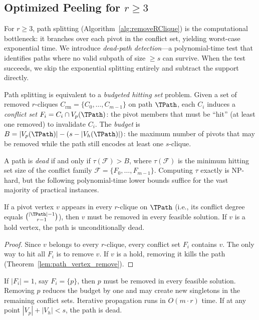 
\subsection{Optimized Peeling for $r \ge 3$}
\label{sec:opt_r3}

For $r \ge 3$, path splitting (Algorithm~\ref{alg:removeRClique}) is the computational bottleneck:
it branches over each pivot in the conflict set, yielding worst-case exponential time.
We introduce \emph{dead-path detection}---a polynomial-time test that identifies paths where no valid subpath of size $\ge s$ can survive.
When the test succeeds, we skip the exponential splitting entirely and subtract the support directly.

Path splitting is equivalent to a \emph{budgeted hitting set} problem.
Given a set of removed $r$-cliques $C_{\mathrm{rm}} = \{C_0, \dots, C_{m-1}\}$ on path $\TPath$,
each $C_i$ induces a \emph{conflict set} $F_i = C_i \cap V_p(\TPath)$:
the pivot members that must be ``hit'' (at least one removed) to invalidate $C_i$.
The \emph{budget} is $B = |V_p(\TPath)| - (s - |V_h(\TPath)|)$: the maximum number of pivots that may be removed while the path still encodes at least one $s$-clique.

A path is \emph{dead} if and only if $\tau(\mathcal{F}) > B$, where $\tau(\mathcal{F})$ is the minimum hitting set size of the conflict family $\mathcal{F} = \{F_0, \dots, F_{m-1}\}$.
Computing $\tau$ exactly is NP-hard, but the following polynomial-time lower bounds suffice for the vast majority of practical instances.

\begin{lemma}\label{lem:forced_v}
If a pivot vertex $v$ appears in every $r$-clique on $\TPath$ (i.e., its conflict degree equals $\binom{|\TPath|-1}{r-1}$), then $v$ must be removed in every feasible solution.
If $v$ is a hold vertex, the path is unconditionally dead.
\end{lemma}

\begin{proof}
Since $v$ belongs to every $r$-clique, every conflict set $F_i$ contains $v$.
The only way to hit all $F_i$ is to remove $v$.
If $v$ is a hold, removing it kills the path (Theorem~\ref{lem:path_vertex_remove}).
\end{proof}

\begin{lemma}\label{lem:singleton_v}
If $|F_i| = 1$, say $F_i = \{p\}$, then $p$ must be removed in every feasible solution.
Removing $p$ reduces the budget by one and may create new singletons in the remaining conflict sets.
Iterative propagation runs in $O(m \cdot r)$ time.
If at any point $|V_p| + |V_h| < s$, the path is dead.
\end{lemma}

